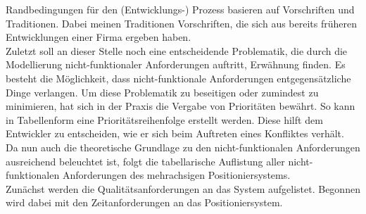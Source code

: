 \documentclass[../../../Bachelorarbeit.tex]{subfiles}
\begin{document}
Randbedingungen für den (Entwicklungs-) Prozess basieren auf Vorschriften und Traditionen. Dabei meinen Traditionen Vorschriften, die sich aus bereits früheren Entwicklungen einer Firma ergeben haben.\\ %
Zuletzt soll an dieser Stelle noch eine entscheidende Problematik, die durch die Modellierung nicht-funktionaler Anforderungen auftritt, Erwähnung finden. Es besteht die Möglichkeit, dass nicht-funktionale Anforderungen entgegensätzliche Dinge verlangen. Um diese Problematik zu beseitigen oder zumindest zu minimieren, hat sich in der Praxis die Vergabe von Prioritäten bewährt. So kann in Tabellenform eine Prioritätsreihenfolge erstellt werden. Diese hilft dem Entwickler zu entscheiden, wie er sich beim Auftreten eines Konfliktes verhält.\\ %
Da nun auch die theoretische Grundlage zu den nicht-funktionalen Anforderungen ausreichend beleuchtet ist, folgt die tabellarische Auflistung aller nicht-funktionalen Anforderungen des mehrachsigen Positioniersystems.\\ 
\newline
Zunächst werden die Qualitätsanforderungen an das System aufgelistet. Begonnen wird dabei mit den Zeitanforderungen an das Positioniersystem.
\end{document}
